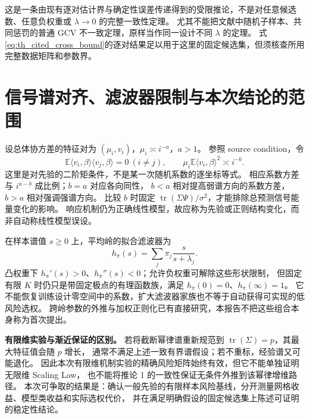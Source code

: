 这是一条由现有逐对估计界与确定性误差传递得到的受限推论，不是对任意候选数、任意负权重或 $\lambda\to0$ 的完整一致性定理。
尤其不能把文献中随机子样本、共同惩罚的普通 GCV 不一致定理，原样当作同一设计不同 $\lambda$ 的定理。
式\eqref{eq:th_cited_cross_bound}的逐对结果足以用于这里的固定候选集，但须核查所用完整数据矩阵和参数界。

\section{信号谱对齐、滤波器限制与本次结论的范围}\label{sec:theory_source}
设总体协方差的特征对为 $(\mu_i,v_i)$，$\mu_i\asymp i^{-a}$，$a>1$。
参照 source condition，令
\begin{equation}\label{eq:th_source_condition}
 \mathbb E\langle v_i,\beta\rangle\langle v_j,\beta\rangle=0\ (i\ne j),\qquad
 \mu_i\mathbb E\langle v_i,\beta\rangle^2\asymp i^{-b}.
\end{equation}
这里是对先验的二阶矩条件，不是某一次随机系数的逐坐标等式\cite{lin,richards}。
相应系数方差与 $i^{a-b}$ 成比例；$b=a$ 对应各向同性，
$b<a$ 相对提高弱谱方向的系数方差，$b>a$ 相对强调强谱方向。
比较 $b$ 时固定 $\operatorname{tr}(\Sigma\Psi)/\sigma^2$，才能排除总预测信号能量变化的影响。
响应机制仍为正确线性模型，故应称为先验或正则结构变化，而非自动称线性模型误设。

在样本谱值 $s\ge0$ 上，平均岭的拟合滤波器为
\begin{equation}\label{eq:th_filter}
 h_\pi(s)=\sum_j\pi_j\frac{s}{s+\lambda_j}.
\end{equation}
凸权重下 $h_\pi'(s)>0$、$h_\pi''(s)<0$；允许负权重可解除这些形状限制，
但固定有限 $K$ 时仍只是带固定极点的有理函数族，满足 $h_\pi(0)=0$、$h_\pi(\infty)=1$。
它不能恢复训练设计零空间中的系数，扩大滤波器家族也不等于自动获得可实现的低风险选权。
跨岭参数的外推与加权正则化已有直接研究\cite{bach,wu}，本报告不把这些组合本身称为首次提出。

\textbf{有限维实验与渐近保证的区别。}
若将截断幂律谱重新规范到 $\operatorname{tr}(\Sigma)=p$，其最大特征值会随 $p$ 增长，
通常不满足上述一致有界谱假设；若不重标，经验谱又可能退化。
因此本次有限维机制实验的精确风险矩阵始终有效，但它不能单独证明无限维 Scaling Law，
也不能将推论 1 的一致性保证无条件外推到该幂律增维路径。
本次可争取的结果是：确认一般先验的有限样本风险基线，分开测量网格收益、模型类收益和实际选权代价，
并在满足明确假设的固定候选集上陈述可证明的稳定性结论。
